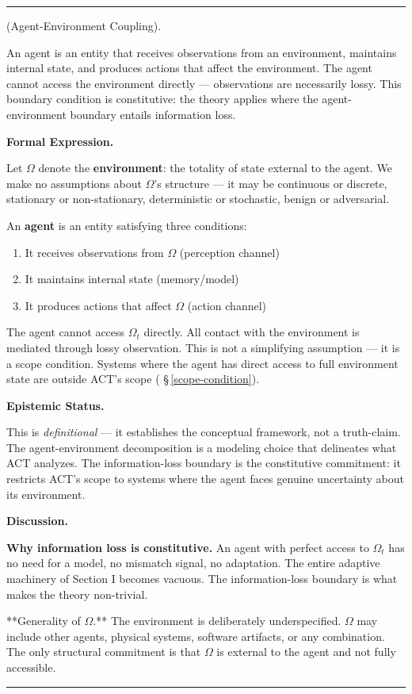 \documentclass[11pt,oneside]{article}
\newcounter{claim}[section]
\renewcommand{\theclaim}{\thesection.\arabic{claim}}
\newenvironment{segment}[2]{%
  \refstepcounter{claim}%
  \bigskip\noindent\hrule\smallskip
  \noindent{\bfseries #1~\theclaim}\enskip(#2).\par\smallskip
  \noindent\ignorespaces
}{%
  \par\smallskip\noindent\hrule\bigskip
}
\newenvironment{definition}[1][]{\begin{segment}{Definition}{#1}}{\end{segment}}
\begin{document}
\begin{definition}[Agent-Environment Coupling]
\label{agent-environment}
An agent is an entity that receives observations from an environment, maintains internal state, and produces actions that affect the environment. The agent cannot access the environment directly — observations are necessarily lossy. This boundary condition is constitutive: the theory applies where the agent-environment boundary entails information loss.



\medskip\noindent\textbf{Formal Expression.}



Let $\Omega$ denote the \textbf{environment}: the totality of state external to the agent. We make no assumptions about $\Omega$'s structure — it may be continuous or discrete, stationary or non-stationary, deterministic or stochastic, benign or adversarial.

An \textbf{agent} is an entity satisfying three conditions:

\begin{enumerate}
  \item It receives observations from $\Omega$ (perception channel)
  \item It maintains internal state (memory/model)
  \item It produces actions that affect $\Omega$ (action channel)
\end{enumerate}



The agent cannot access $\Omega_t$ directly. All contact with the environment is mediated through lossy observation. This is not a simplifying assumption — it is a scope condition. Systems where the agent has direct access to full environment state are outside ACT's scope ( \S\,\ref{scope-condition}).


\medskip\noindent\textbf{Epistemic Status.}


This is \textit{definitional} — it establishes the conceptual framework, not a truth-claim. The agent-environment decomposition is a modeling choice that delineates what ACT analyzes. The information-loss boundary is the constitutive commitment: it restricts ACT's scope to systems where the agent faces genuine uncertainty about its environment.


\medskip\noindent\textbf{Discussion.}


\textbf{Why information loss is constitutive.} An agent with perfect access to $\Omega_t$ has no need for a model, no mismatch signal, no adaptation. The entire adaptive machinery of Section I becomes vacuous. The information-loss boundary is what makes the theory non-trivial.

**Generality of $\Omega$.** The environment is deliberately underspecified. $\Omega$ may include other agents, physical systems, software artifacts, or any combination. The only structural commitment is that $\Omega$ is external to the agent and not fully accessible.

\end{definition}
\end{document}
